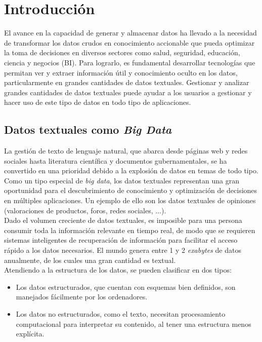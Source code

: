 \chapter{Introducción}\label{Chapter1} 

El avance en la capacidad de generar y almacenar datos ha llevado a la necesidad de transformar los datos crudos en conocimiento accionable que pueda optimizar la toma de decisiones en diversos sectores como salud, seguridad, educación, ciencia y negocios (BI). Para lograrlo, es fundamental desarrollar tecnologías que permitan ver y extraer información útil y conocimiento oculto en los datos, particularmente en grandes cantidades de datos textuales. Gestionar y analizar grandes cantidades de datos textuales puede ayudar a los usuarios a gestionar y hacer uso de este tipo de datos en todo tipo de aplicaciones.

\section{Datos textuales como \textit{Big Data}}
La gestión de texto de lenguaje natural, que abarca desde páginas web y redes sociales hasta literatura científica y documentos gubernamentales, se ha convertido en una prioridad debido a la explosión de datos en temas de todo tipo. Como un tipo especial de \textit{big data}, los datos textuales representan una gran oportunidad para el descubrimiento de conocimiento y optimización de decisiones en múltiples aplicaciones. Un ejemplo de ello son los datos textuales de opiniones (valoraciones de productos, foros, redes sociales, ...). \\

Dado el volumen creciente de datos textuales, es imposible para una persona consumir toda la información relevante en tiempo real, de modo que se requieren sistemas inteligentes de recuperación de información para facilitar el acceso rápido a los datos necesarios. El mundo genera entre 1 y 2 \textit{exabytes} de datos anualmente, de los cuales una gran cantidad es textual. \\

Atendiendo a la estructura de los datos, se pueden clasificar en dos tipos:
\begin{itemize}
\item Los datos estructurados, que cuentan con esquemas bien definidos, son manejados fácilmente por los ordenadores. 
\item Los datos no estructurados, como el texto, necesitan procesamiento computacional para interpretar su contenido, al tener una estructura menos explícita.
\end{itemize}

